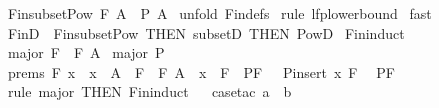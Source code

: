 \begin{isabellebody}
\isanewline
{}\isamarkupfalse%
\ Fin{\isacharunderscore}subset{\isacharunderscore}Pow{\isacharcolon}\ {\isachardoublequoteopen}{\isacharpercent}F\ A\ {\isacharless}{\isacharequal}\ {\isacharpercent}P\ A{\isachardoublequoteclose}\isanewline
%
\isadelimproof
%
\endisadelimproof
%
\isatagproof
{}\isamarkupfalse%
\ {\isacharparenleft}unfold\ Fin{\isachardot}defs{\isacharparenright}\isanewline
{}\isamarkupfalse%
\ {\isacharparenleft}rule\ lfp{\isacharunderscore}lowerbound{\isacharparenright}\isanewline
{}\isamarkupfalse%
\ fast\isanewline
{}\isamarkupfalse%
%
\endisatagproof
{\isafoldproof}%
%
\isadelimproof
\isanewline
%
\endisadelimproof
\isanewline
\isanewline
{}\isamarkupfalse%
\ FinD\ {\isacharequal}\ Fin{\isacharunderscore}subset{\isacharunderscore}Pow\ {\isacharbrackleft}THEN\ subsetD\ {\isacharbrackleft}THEN\ PowD{\isacharbrackright}{\isacharbrackright}\isanewline
\isanewline
\isanewline
{}\isamarkupfalse%
\ Fin{\isacharunderscore}induct{\isacharcolon}\isanewline
{}\ major{}{\isacharcolon}\ {\isachardoublequoteopen}F\ {\isacharcolon}\ {\isacharpercent}F\ A{\isachardoublequoteclose}\isanewline
{}\ major{}{\isacharcolon}\ {\isachardoublequoteopen}P\ {\isacharparenleft}{\isacharbraceleft}{\isacharbraceright}{\isacharparenright}{\isachardoublequoteclose}\ \isanewline
{}\ prems{\isacharcolon}\ {\isachardoublequoteopen}{\isacharbang}{\isacharbang}F\ x{\isachardot}\ {\isacharbrackleft}{\isacharbar}\ x\ {\isacharcolon}\ A{\isacharsemicolon}\ \ F\ {\isacharcolon}\ {\isacharpercent}F\ A{\isacharsemicolon}\ \ x\ {\isachartilde}{\isacharcolon}\ F{\isacharsemicolon}\ \ P{\isacharparenleft}F{\isacharparenright}\ {\isacharbar}{\isacharbrackright}\ {\isacharequal}{\isacharequal}{\isachargreater}\ P{\isacharparenleft}insert\ x\ F{\isacharparenright}{\isachardoublequoteclose}\isanewline
{}\ \ {\isachardoublequoteopen}P{\isacharparenleft}F{\isacharparenright}{\isachardoublequoteclose}\isanewline
%
\isadelimproof
%
\endisadelimproof
%
\isatagproof
{}\isamarkupfalse%
\ {\isacharparenleft}rule\ major{}\ {\isacharbrackleft}THEN\ Fin{\isachardot}induct{\isacharbrackright}{\isacharparenright}\isanewline
{}\isamarkupfalse%
\ {}\isanewline
{}\isamarkupfalse%
\ {\isacharparenleft}case{\isacharunderscore}tac\ {\isachardoublequoteopen}a\ {\isacharcolon}\ b{\isachardoublequoteclose}{\isacharparenright}\isanewline

\end{isabellebody}
